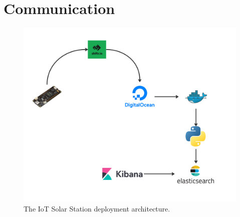 \section{Communication}

\begin{figure}[H]
    \centering
    \includegraphics[width=\linewidth]{../assets/png/solar-station-arch}
    \caption{The IoT Solar Station deployment architecture.}
    \label{fig:kib}
\end{figure}\

